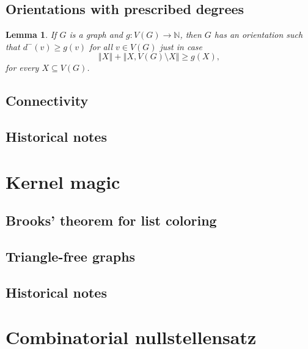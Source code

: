 \documentclass{tufte-book} %
\theoremstyle{plain}
\newtheorem{lemma}{Lemma}
\newcommand{\size}[1]{\left\Vert#1\right\Vert}
\newcommand{\func}[3]{#1\colon #2 \rightarrow #3}
\newcommand{\IN}{\mathbb{N}}
\begin{document}
\section{Orientations with prescribed degrees}
\begin{lemma}\label{InOrientations} If $G$ is a graph and $\func{g}{V(G)}{\IN}$,
then $G$ has an orientation such that $d^{-}(v)\ge g(v)$ for all $v\in V(G)$ just in case
\[
\size{X}+\size{X,V(G)\setminus X}\ge g(X),
\]
for every $X \subseteq V(G)$.
\end{lemma}

\section{Connectivity}
\section{Historical notes}

\chapter{Kernel magic}
\section{Brooks' theorem for list coloring}
\section{Triangle-free graphs}
\section{Historical notes}

\chapter{Combinatorial nullstellensatz}
\end{document}
